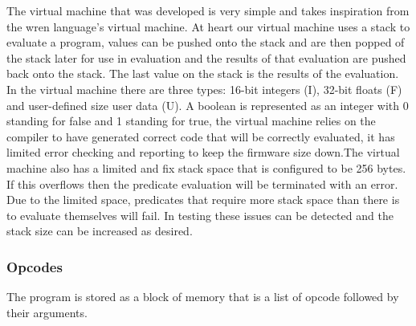 The virtual machine that was developed is very simple and takes inspiration from the wren \cite{wren} language's virtual machine. At heart our virtual machine uses a stack to evaluate a program, values can be pushed onto the stack and are then popped of the stack later for use in evaluation and the results of that evaluation are pushed back onto the stack. The last value on the stack is the results of the evaluation. In the virtual machine there are three types: 16-bit integers (I), 32-bit floats (F) and user-defined size user data (U). A boolean is represented as an integer with 0 standing for false and 1 standing for true, the virtual machine relies on the compiler to have generated correct code that will be correctly evaluated, it has limited error checking and reporting to keep the firmware size down.The virtual machine also has a limited and fix stack space that is configured to be 256 bytes. If this overflows then the predicate evaluation will be terminated with an error. Due to the limited space, predicates that require  more stack space than there is to evaluate themselves will fail. In testing these issues can be detected and the stack size can be increased as desired.

\subsubsection{Opcodes}

The program is stored as a block of memory that is a list of opcode followed by their arguments.

